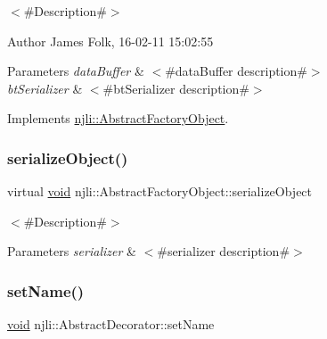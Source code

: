 $<$\#\+Description\#$>$ 

\begin{DoxyAuthor}{Author}
James Folk, 16-\/02-\/11 15\+:02\+:55
\end{DoxyAuthor}

\begin{DoxyParams}{Parameters}
{\em data\+Buffer} & $<$\#data\+Buffer description\#$>$ \\
\hline
{\em bt\+Serializer} & $<$\#bt\+Serializer description\#$>$ \\
\hline
\end{DoxyParams}


Implements \mbox{\hyperlink{classnjli_1_1_abstract_factory_object_aad2fbe86fb3bdecf02918a96b9c57976}{njli\+::\+Abstract\+Factory\+Object}}.

\mbox{\label{classnjli_1_1_physics_contact_a4fc4bcd9d1930911474210c047372fc0}} 
\subsubsection{\texorpdfstring{serialize\+Object()}{serializeObject()}}
{\footnotesize\ttfamily virtual \mbox{\hyperlink{_thread_8h_af1e856da2e658414cb2456cb6f7ebc66}{void}} njli\+::\+Abstract\+Factory\+Object\+::serialize\+Object}

$<$\#\+Description\#$>$


\begin{DoxyParams}{Parameters}
{\em serializer} & $<$\#serializer description\#$>$ \\
\hline
\end{DoxyParams}
\mbox{\label{classnjli_1_1_physics_contact_a087eb5f8d9f51cc476f12f1d10a3cb95}} 
\subsubsection{\texorpdfstring{set\+Name()}{setName()}}
{\footnotesize\ttfamily \mbox{\hyperlink{_thread_8h_af1e856da2e658414cb2456cb6f7ebc66}{void}} njli\+::\+Abstract\+Decorator\+::set\+Name}

